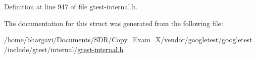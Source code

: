 Definition at line 947 of file gtest-\/internal.\+h.



The documentation for this struct was generated from the following file\+:\begin{DoxyCompactItemize}
\item 
/home/bhargavi/\+Documents/\+S\+D\+R/\+Copy\+\_\+\+Exam\+\_\+X/vendor/googletest/googletest/include/gtest/internal/\hyperlink{gtest-internal_8h}{gtest-\/internal.\+h}\end{DoxyCompactItemize}

